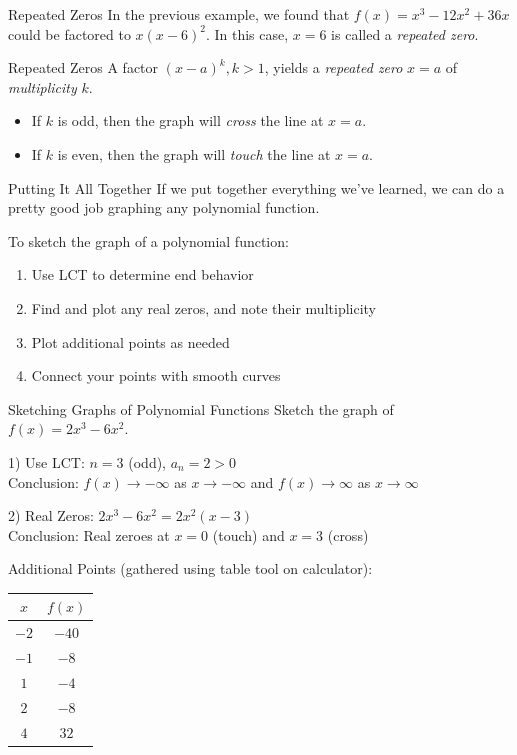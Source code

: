 \documentclass{beamer}
\newcommand{\fp}[1]{\left({#1}\right)} %
\def\to{\rightarrow}
\begin{document}
\begin{frame}[t]{Repeated Zeros}
In the previous example, we found that $f(x) = x^3 - 12x^2 + 36x$ could be factored to $x(x-6)^2$. In this case, $x = 6$ is called a \textit{repeated zero}.

\begin{block}{Repeated Zeros}
A factor $(x - a)^k, k > 1$, yields a \textit{repeated zero} $x = a$ of \textit{multiplicity} $k$. \begin{itemize}
\item If $k$ is odd, then the graph will \textit{cross} the line at $x = a$.
\item If $k$ is even, then the graph will \textit{touch} the line at $x = a$.
\end{itemize}
\end{block}
\end{frame}

\begin{frame}[t]{Putting It All Together}
If we put together everything we've learned, we can do a pretty good job graphing any polynomial function. 

\pause

To sketch the graph of a polynomial function: \begin{enumerate}[1)]
\item Use LCT to determine end behavior
\item Find and plot any real zeros, and note their multiplicity
\item Plot additional points as needed
\item Connect your points with smooth curves
\end{enumerate}
\end{frame}

\begin{frame}[t]{Sketching Graphs of Polynomial Functions}
Sketch the graph of $f(x) = 2x^3 - 6x^2$.

\pause

1) Use LCT: $n = 3$ (odd), $a_n = 2 > 0$ \\
Conclusion: $f(x) \to -\infty$ as $x\to -\infty$ and $f(x) \to \infty$ as $x \to \infty$

\pause

2) Real Zeros: $2x^3 - 6x^2 = 2x^2\fp{x - 3}$ \\
Conclusion: Real zeroes at $x = 0$ (touch) and $x = 3$ (cross)

\pause

Additional Points (gathered using table tool on calculator): \\
\begin{tabular}{c|c}
$x$ & $f(x)$ \\ \hline
$-2$ & $-40$ \\
$-1$ & $-8$ \\
$1$ & $-4$ \\
$2$ & $-8$ \\
$4$ & $32$
\end{tabular}
\end{frame}
\end{document}
